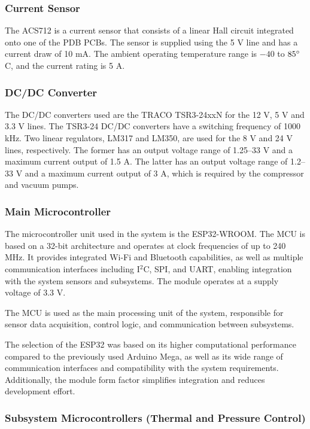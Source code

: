 \subsubsection{Current Sensor}

The ACS712 is a current sensor that consists of a linear Hall circuit integrated onto one of the PDB PCBs. The sensor is supplied using the 5 V line and has a current draw of 10 mA. The ambient operating temperature range is $-40$ to $85^\circ$C, and the current rating is 5 A.

\subsubsection{DC/DC Converter}

The DC/DC converters used are the TRACO TSR3-24xxN for the 12 V, 5 V and 3.3 V lines. The TSR3-24 DC/DC converters have a switching frequency of 1000 kHz. Two linear regulators, LM317 and LM350, are used for the 8 V and 24 V lines, respectively. The former has an output voltage range of 1.25--33 V and a maximum current output of 1.5 A. The latter has an output voltage range of 1.2--33 V and a maximum current output of 3 A, which is required by the compressor and vacuum pumps.

\subsubsection{Main Microcontroller}

The microcontroller unit used in the system is the ESP32-WROOM. The MCU is based on a 32-bit architecture and operates at clock frequencies of up to 240 MHz. It provides integrated Wi-Fi and Bluetooth capabilities, as well as multiple communication interfaces including I$^2$C, SPI, and UART, enabling integration with the system sensors and subsystems. The module operates at a supply voltage of 3.3 V.

The MCU is used as the main processing unit of the system, responsible for sensor data acquisition, control logic, and communication between subsystems.

The selection of the ESP32 was based on its higher computational performance compared to the previously used Arduino Mega, as well as its wide range of communication interfaces and compatibility with the system requirements. Additionally, the module form factor simplifies integration and reduces development effort.

\subsubsection{Subsystem Microcontrollers (Thermal and Pressure Control)}

